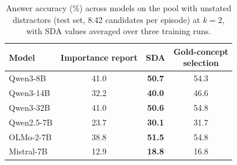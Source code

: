 \begin{table}[!htbp]
\centering
\caption{Answer accuracy (\%) across models on the pool with unstated distractors
(test set, 8.42 candidates per episode) at $k=2$, with SDA values
averaged over three training runs.}
\label{tab:stress}
\small
\setlength{\tabcolsep}{4pt}
\begin{tabular}{lccc}
\toprule
Model & Importance report & \textbf{SDA} & \shortstack{Gold-concept\\selection} \\
\midrule
Qwen3-8B & 41.0 & \textbf{50.7} & 54.3 \\
Qwen3-14B & 32.2 & \textbf{40.0} & 46.6 \\
Qwen3-32B & 41.0 & \textbf{50.6} & 54.8 \\
Qwen2.5-7B & 23.7 & \textbf{30.1} & 31.7 \\
OLMo-2-7B & 38.8 & \textbf{51.5} & 54.8 \\
Mistral-7B & 12.9 & \textbf{18.8} & 16.8 \\
\bottomrule
\end{tabular}

\end{table}
